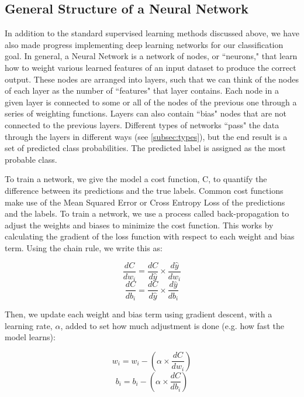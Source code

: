 \documentclass{article}
\begin{document}
\subsection{General Structure of a Neural Network}
In addition to the standard supervised learning methods discussed above, we have also made progress implementing deep learning networks for our classification goal. In general, a Neural Network is a network of nodes, or ``neurons," that learn how to weight various learned features of an input dataset to produce the correct output. These nodes are arranged into layers, such that we can think of the nodes of each layer as the number of ``features" that layer contains. Each node in a given layer is connected to some or all of the nodes of the previous one through a series of weighting functions. Layers can also contain ``bias" nodes that are not connected to the previous layers. Different types of networks ``pass" the data through the layers in different ways (see \ref{subsec:types}), but the end result is a set of predicted class probabilities. The predicted label is assigned as the most probable class. 

To train a network, we give the model a cost function, C, to quantify the difference between its predictions and the true labels. Common cost functions make use of the Mean Squared Error or Cross Entropy Loss of the predictions and the labels. To train a network, we use a process called back-propagation to adjust the weights and biases to minimize the cost function. This works by calculating the gradient of the loss function with respect to each weight and bias term. Using the chain rule, we write this as:

\begin{equation}
    \frac{dC}{dw_i} = \frac{dC}{d\hat{y}} \times \frac{d\hat{y}}{dw_i}
\end{equation}
\begin{equation}
    \frac{dC}{db_i} = \frac{dC}{d\hat{y}} \times \frac{d\hat{y}}{db_i}
\end{equation}

\noindent Then, we update each weight and bias term using gradient descent, with a learning rate, $\alpha$, added to set how much adjustment is done (e.g. how fast the model learns):

\begin{equation}
    w_i = w_i - (\alpha \times \frac{dC}{dw_i})
\end{equation}
\begin{equation}
    b_i = b_i - (\alpha \times \frac{dC}{db_i})
\end{equation}
\end{document}
